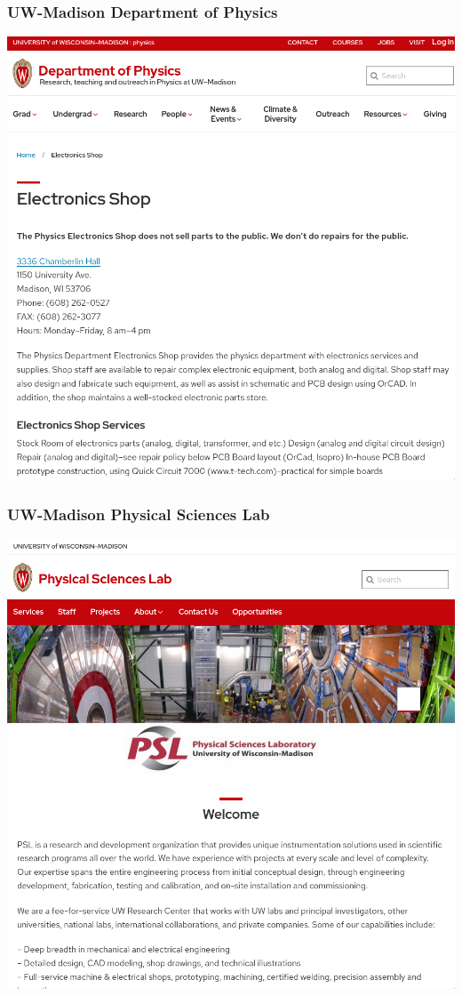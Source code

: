 \documentclass{presentation}
\begin{document}
{

\begin{frame}\frametitle{UW-Madison Department of Physics}
  \includegraphics[width=\textwidth]{"./madison-physics.png"}
\end{frame}

\begin{frame}\frametitle{UW-Madison Physical Sciences Lab}
  \includegraphics[width=\textwidth]{"./psl.png"}
\end{frame}

}
\end{document}
